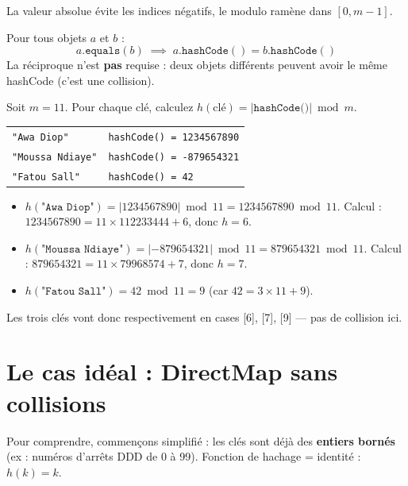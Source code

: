\documentclass[11pt,a4paper]{article}
\begin{document}
La valeur absolue évite les indices négatifs, le modulo ramène dans $[0, m-1]$.

\begin{theorembox}
Pour tous objets $a$ et $b$ :
\[
a.\texttt{equals}(b) \;\implies\; a.\texttt{hashCode}() = b.\texttt{hashCode}()
\]
La réciproque n'est \textbf{pas} requise : deux objets différents peuvent avoir le même hashCode (c'est une collision).
\end{theorembox}

\begin{appliboxQ}
Soit $m = 11$. Pour chaque clé, calculez $h(\text{clé}) = |\texttt{hashCode()}| \bmod m$.

\medskip
\begin{tabular}{@{}ll@{}}
\texttt{"Awa Diop"} & \texttt{hashCode() = 1234567890} \\
\texttt{"Moussa Ndiaye"} & \texttt{hashCode() = -879654321} \\
\texttt{"Fatou Sall"} & \texttt{hashCode() = 42} \\
\end{tabular}
\end{appliboxQ}

\begin{appliboxR}[Réponse]
\begin{itemize}[nosep]
    \item $h(\texttt{"Awa Diop"}) = |1234567890| \bmod 11 = 1234567890 \bmod 11$. Calcul : $1234567890 = 11 \times 112233444 + 6$, donc $h = 6$.
    \item $h(\texttt{"Moussa Ndiaye"}) = |-879654321| \bmod 11 = 879654321 \bmod 11$. Calcul : $879654321 = 11 \times 79968574 + 7$, donc $h = 7$.
    \item $h(\texttt{"Fatou Sall"}) = 42 \bmod 11 = 9$ (car $42 = 3 \times 11 + 9$).
\end{itemize}
Les trois clés vont donc respectivement en cases [6], [7], [9] --- pas de collision ici.
\end{appliboxR}

\section{Le cas idéal : DirectMap sans collisions}

Pour comprendre, commençons simplifié : les clés sont déjà des \textbf{entiers bornés} (ex : numéros d'arrêts DDD de 0 à 99). Fonction de hachage = identité : $h(k) = k$.
\end{document}
